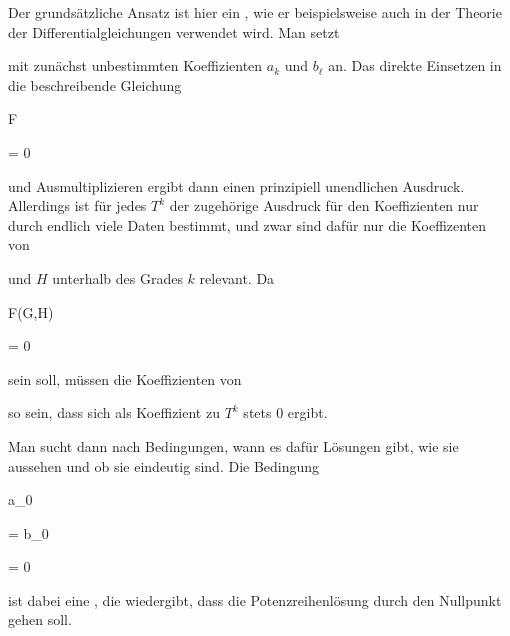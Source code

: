 Der grundsätzliche Ansatz ist hier ein  {,} wie er beispielsweise auch in der Theorie der Differentialgleichungen verwendet wird. Man setzt


 {  }


mit zunächst unbestimmten Koeffizienten $a_k$ und $b_\ell$ an. Das direkte Einsetzen in die beschreibende Gleichung


\mavergleichskette

{\vergleichskette

{ F
}

{ = }{ 0
}

{  }{
}

{    }{
}

{   }{
}

}
{}{}{}
und Ausmultiplizieren ergibt dann einen prinzipiell unendlichen Ausdruck. Allerdings ist für jedes $T^k$ der zugehörige Ausdruck für den Koeffizienten nur durch endlich viele Daten bestimmt, und zwar sind dafür nur die Koeffizenten von

 und $H$ unterhalb des Grades $k$ relevant. Da


\mavergleichskette

{\vergleichskette

{ F(G,H)
}

{ = }{ 0
}

{  }{
}

{    }{
}

{   }{
}

}
{}{}{}
sein soll, müssen die Koeffizienten von

 so sein, dass sich als Koeffizient zu $T^k$ stets $0$ ergibt.


Man sucht dann nach Bedingungen, wann es dafür Lösungen gibt, wie sie aussehen und ob sie eindeutig sind. Die Bedingung


\mavergleichskette

{\vergleichskette

{ a_0
}

{ = }{ b_0
}

{ = }{ 0
}

{    }{
}

{   }{
}

}
{}{}{}
ist dabei eine  {,} die wiedergibt, dass die Potenzreihenlösung durch den Nullpunkt gehen soll.


